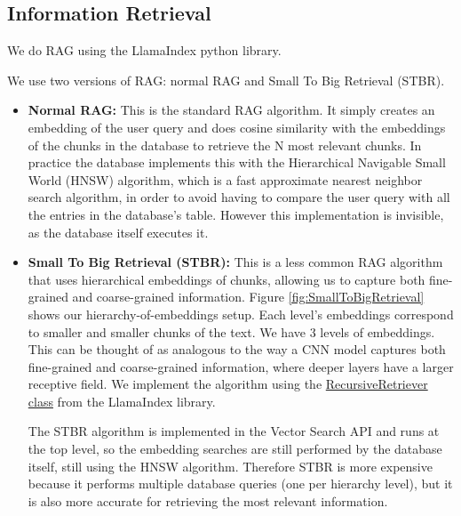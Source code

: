 \documentclass[a4paper,12pt,twoside]{ThesisStyle}
\begin{document}
\subsection{Information Retrieval}
\label{subsec:information_retrieval}

We do RAG using the LlamaIndex python library.

We use two versions of RAG: normal RAG and Small To Big Retrieval (STBR).

\begin{itemize}
  \item \textbf{Normal RAG:} This is the standard RAG algorithm. It simply creates an embedding of the user query and does cosine similarity with the embeddings of the chunks in the database to retrieve the N most relevant chunks. In practice the database implements this with the Hierarchical Navigable Small World (HNSW) \cite{Malkov2018EfficientRobustApproximateNearestNeighbors} algorithm, which is a fast approximate nearest neighbor search algorithm, in order to avoid having to compare the user query with all the entries in the database's table. However this implementation is invisible, as the database itself executes it.
  \item \textbf{Small To Big Retrieval (STBR):} This is a less common RAG algorithm that uses hierarchical embeddings of chunks, allowing us to capture both fine-grained and coarse-grained information. Figure \ref{fig:SmallToBigRetrieval} shows our hierarchy-of-embeddings setup. Each level's embeddings correspond to smaller and smaller chunks of the text. We have 3 levels of embeddings. This can be thought of as analogous to the way a CNN model captures both fine-grained and coarse-grained information, where deeper layers have a larger receptive field. We implement the algorithm using the \href{https://docs.llamaindex.ai/en/stable/examples/retrievers/recursive_retriever_nodes/}{RecursiveRetriever class} from the LlamaIndex library.
  
  The STBR algorithm is implemented in the Vector Search API and runs at the top level, so the embedding searches are still performed by the database itself, still using the HNSW algorithm. Therefore STBR is more expensive because it performs multiple database queries (one per hierarchy level), but it is also more accurate for retrieving the most relevant information.
\end{itemize}
\end{document}

